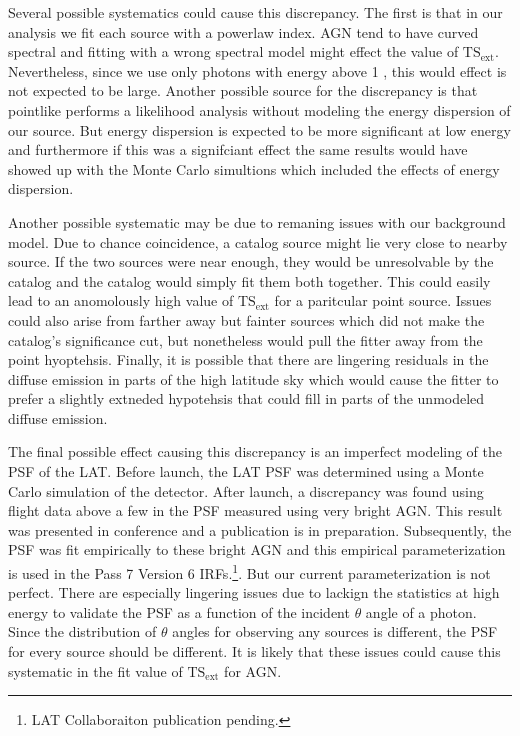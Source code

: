 \documentclass[12pt,preprint]{aastex}
\newcommand{\gev}{\text{GeV}\xspace}
\newcommand{\tsext}{{\ensuremath{\text{TS}_\text{ext}}}\xspace}
\begin{document}
Several possible systematics could cause this discrepancy. The first
is that in our analysis we fit each source with a powerlaw index.
AGN tend to have curved spectral and fitting with a wrong spectral
model might effect the value of \tsext. Nevertheless, since we use only
photons with energy above 1 \gev, this would effect is not expected to be large.
Another possible source for the discrepancy is that pointlike performs a
likelihood analysis without modeling the energy dispersion of our source.
But energy dispersion is expected to be more significant at low
energy and furthermore if this was a signifciant effect the same results
would have showed up with the Monte Carlo simultions which included the
effects of energy dispersion. 

Another possible systematic may be due to remaning issues with our
background model. Due to chance coincidence, a catalog source might
lie very close to nearby source. If the two sources were near enough,
they would be unresolvable by the catalog and the catalog would simply
fit them both together.  This could easily lead to an anomolously high
value of \tsext for a paritcular point source. Issues could also arise
from farther away but fainter sources which did not make the catalog's
significance cut, but nonetheless would pull the fitter away from the
point hyoptehsis.  Finally, it is possible that there are lingering
residuals in the diffuse emission in parts of the high latitude sky
which would cause the fitter to prefer a slightly extneded hypotehsis
that could fill in parts of the unmodeled diffuse emission.

The final possible effect causing this discrepancy is an imperfect
modeling of the PSF of the LAT.  Before launch, the LAT PSF
was determined using a Monte Carlo simulation of the detector.
After launch, a discrepancy was found using flight data above a
few \gev in the PSF measured using very bright AGN.  This result
was presented in conference and a publication is in preparation.
Subsequently, the PSF was fit empirically to these bright AGN and this
empirical parameterization is used in the Pass 7 Version 6 IRFs.\footnote{
LAT Collaboraiton publication pending.
}. But our current parameterization is not perfect. There are especially
lingering issues due to lackign the statistics at high energy to
validate the PSF as a function of the incident $\theta$ angle of a
photon. Since the distribution of $\theta$ angles for observing any
sources is different, the PSF for every source should be different.
It is likely that these issues could cause this systematic in the fit
value of \tsext for AGN.
\end{document}
